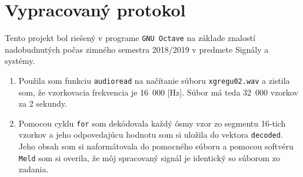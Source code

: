 \documentclass[10pt, a4paper, twocolumn]{article}
\begin{document}
\section*{Vypracovaný protokol}
Tento projekt bol riešený v programe \texttt{GNU Octave} na základe znalostí nadobudnutých počas zimného semestra 2018/2019 v predmete Signály a systémy.

\begin{enumerate}[leftmargin=*]
\item Použila som funkciu \texttt{audioread} na načítanie súboru \texttt{xgregu02.wav} a zistila som, že vzorkovacia frekvencia je 16~000 [Hz]. Súbor má teda 32~000 vzorkov za 2 sekundy.

\item Pomocou cyklu \texttt{for} som dekódovala každý ôsmy vzor zo segmentu 16-tich vzorkov a jeho odpovedajúcu hodnotu som si uložila do vektora \texttt{decoded}. Jeho obsah som si naformátovala do pomocného súboru a pomocou softvéru \texttt{Meld} som si overila, že môj spracovaný signál je identický so súborom zo zadania.

\begin{figure}[H]
\centering
{}
\end{figure}


\end{enumerate}
\end{document}
